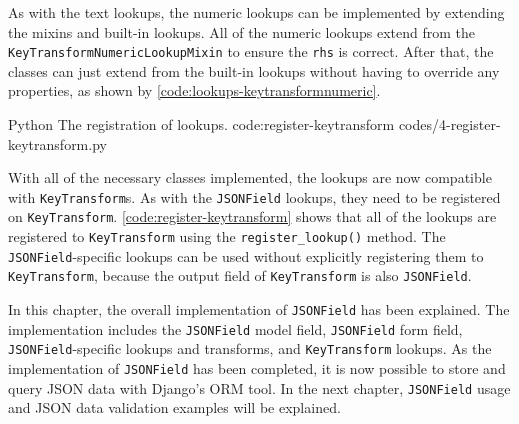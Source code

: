 As with the text lookups, the numeric lookups can be implemented by extending
the mixins and built-in lookups. All of the numeric lookups extend from the
\verb|KeyTransformNumericLookupMixin| to ensure the \verb|rhs| is correct.
After that, the classes can just extend from the built-in lookups without
having to override any properties, as shown by
\autoref{code:lookups-keytransformnumeric}.

\listing
{Python}
{The registration of  lookups.}
{code:register-keytransform}
{codes/4-register-keytransform.py}

With all of the necessary classes implemented, the lookups are now compatible
with \verb|KeyTransform|s. As with the \verb|JSONField| lookups, they need to
be registered on \verb|KeyTransform|. \autoref{code:register-keytransform}
shows that all of the lookups are registered to \verb|KeyTransform| using the
\verb|register_lookup()| method. The \verb|JSONField|-specific lookups can be
used without explicitly registering them to \verb|KeyTransform|, because
the output field of \verb|KeyTransform| is also \verb|JSONField|.

In this chapter, the overall implementation of \verb|JSONField| has been
explained. The implementation includes the \verb|JSONField| model field,
\verb|JSONField| form field, \verb|JSONField|-specific lookups and transforms,
and \verb|KeyTransform| lookups. As the implementation of \verb|JSONField| has
been completed, it is now possible to store and query JSON data with Django's
ORM tool. In the next chapter, \verb|JSONField| usage and JSON data validation
examples will be explained.
